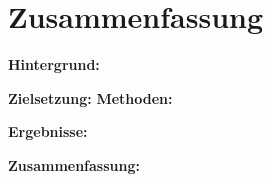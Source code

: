 \section*{Zusammenfassung}
\textbf{Hintergrund:} 

\textbf{Zielsetzung:} 
\textbf{Methoden:} 

\textbf{Ergebnisse:} 


\textbf{Zusammenfassung:}
    